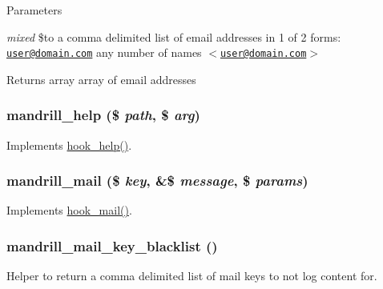 \begin{DoxyParams}{Parameters}
\item[{\em mixed}]\$to a comma delimited list of email addresses in 1 of 2 forms: \href{mailto:user@domain.com}{\tt user@domain.com} any number of names $<$\href{mailto:user@domain.com}{\tt user@domain.com}$>$\end{DoxyParams}
\begin{DoxyReturn}{Returns}
array array of email addresses 
\end{DoxyReturn}
\hypertarget{mandrill_8module_a3352d7dded081944f440fae1bebfe334}{
\subsubsection[{mandrill\_\-help}]{\setlength{\rightskip}{0pt plus 5cm}mandrill\_\-help (\$ {\em path}, \/  \$ {\em arg})}}
\label{mandrill_8module_a3352d7dded081944f440fae1bebfe334}
Implements \hyperlink{group__hooks_ga5589c2714a782738e8851c4c90231f0e}{hook\_\-help()}. \hypertarget{mandrill_8module_a671b5ea2005ac860f0f0107655b40553}{
\subsubsection[{mandrill\_\-mail}]{\setlength{\rightskip}{0pt plus 5cm}mandrill\_\-mail (\$ {\em key}, \/  \&\$ {\em message}, \/  \$ {\em params})}}
\label{mandrill_8module_a671b5ea2005ac860f0f0107655b40553}
Implements \hyperlink{group__hooks_gacdeb1cba0d0a86ac4de3fff7d4765777}{hook\_\-mail()}. \hypertarget{mandrill_8module_ac9823b256c5cfab79f065b345f9aaaa9}{
\subsubsection[{mandrill\_\-mail\_\-key\_\-blacklist}]{\setlength{\rightskip}{0pt plus 5cm}mandrill\_\-mail\_\-key\_\-blacklist ()}}
\label{mandrill_8module_ac9823b256c5cfab79f065b345f9aaaa9}
Helper to return a comma delimited list of mail keys to not log content for.

